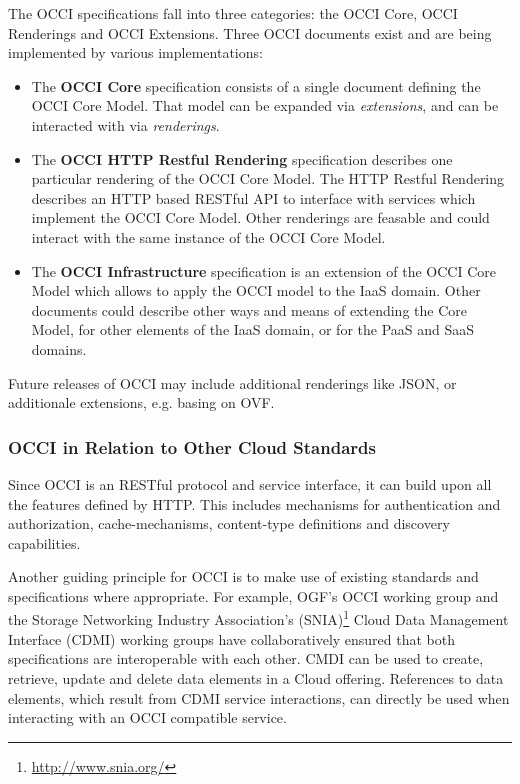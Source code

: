 \documentclass[10pt,conference,final,letterpaper,twoside,twocolumn,]{IEEEtran}
\newcommand{\I}[1]{\textit{#1}}
\newcommand{\B}[1]{\textbf{#1}}
\begin{document}
 The OCCI specifications fall into three categories: the OCCI Core,
 OCCI Renderings and OCCI Extensions.  Three OCCI documents exist and
 are being implemented by various implementations:
 
 \begin{itemize}
 
  \item The \B{OCCI Core} specification consists of a single document
  defining the OCCI Core Model. That model can be expanded via
  \I{extensions}, and can be interacted with via \I{renderings}.

  \item The \B{OCCI HTTP Restful Rendering} specification describes
  one particular rendering of the OCCI Core Model.  The HTTP Restful
  Rendering describes an HTTP based RESTful API to interface with
  services which implement the OCCI Core Model.  Other renderings are
  feasable and could interact with the same instance of the OCCI Core
  Model.  
 
  \item The \B{OCCI Infrastructure} specification is an extension of
  the OCCI Core Model which allows to apply the OCCI model to the IaaS
  domain. Other documents could describe other ways and means of
  extending the Core Model, for other elements of the IaaS domain, or
  for the PaaS and SaaS domains.  
  
 \end{itemize}

 Future releases of OCCI may include additional renderings like JSON,
 or additionale extensions, e.g. basing on OVF.

 \subsubsection{OCCI in Relation to Other Cloud Standards}

 Since OCCI is an RESTful protocol and service interface, it can build
 upon all the features defined by HTTP. This includes mechanisms for
 authentication and authorization, cache-mechanisms, content-type
 definitions and discovery capabilities.
 
 Another guiding principle for OCCI is to make use of existing
 standards and specifications where appropriate.  For example, OGF's
 OCCI working group and the Storage Networking Industry Association's
 (SNIA)\footnote{\url{http://www.snia.org/}} Cloud Data Management
 Interface (CDMI) working groups have collaboratively ensured that
 both specifications are interoperable with each other.  CMDI can be
 used to create, retrieve, update and delete data elements in a Cloud
 offering. References to data elements, which result from CDMI service
 interactions, can directly be used when interacting with an OCCI
 compatible service.
 
\end{document}
